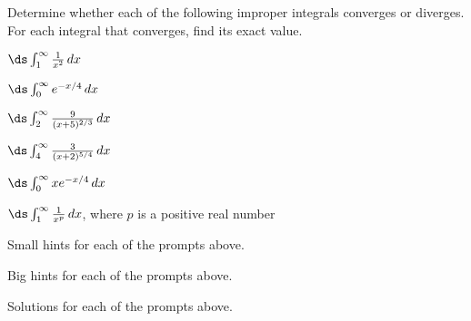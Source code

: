\begin{activity} \label{A:6.5.2}  Determine whether each of the following improper integrals converges or diverges.  For each integral that converges, find its exact value.
\ba
	\item $\ds \int_1^{\infty} \frac{1}{x^2} \, dx$
	\item $\ds \int_0^{\infty} e^{-x/4} \, dx$
	\item $\ds \int_2^{\infty} \frac{9}{(x+5)^{2/3}} \, dx$
	\item $\ds \int_4^{\infty} \frac{3}{(x+2)^{5/4}} \, dx$
	\item $\ds \int_0^{\infty} x e^{-x/4} \, dx$ 
	\item $\ds \int_1^{\infty} \frac{1}{x^p} \, dx$, where $p$ is a positive real number
\ea

\end{activity}
\begin{smallhint}
\ba
	\item Small hints for each of the prompts above.
\ea
\end{smallhint}
\begin{bighint}
\ba
	\item Big hints for each of the prompts above.
\ea
\end{bighint}
\begin{activitySolution}
\ba
	\item Solutions for each of the prompts above.
\ea
\end{activitySolution}
\aftera